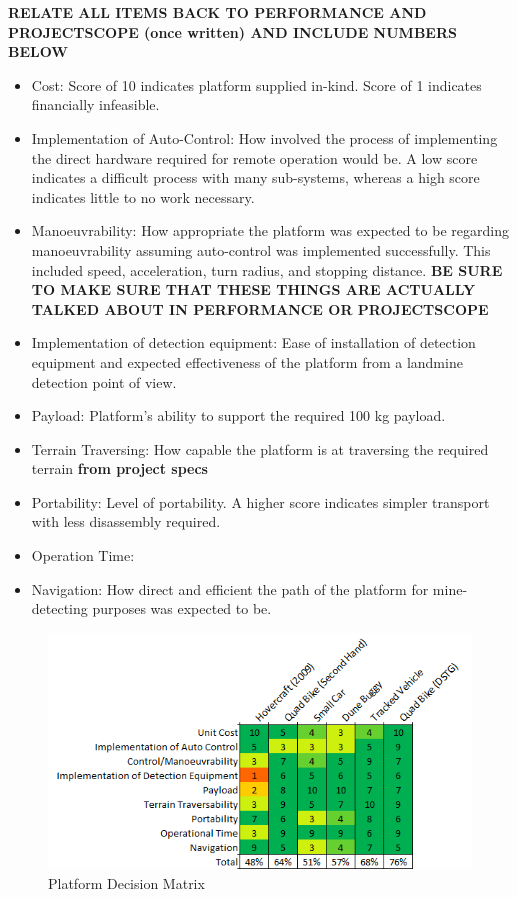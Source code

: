 \documentclass[main.tex]{subfiles}
\begin{document}
\textbf{\color{red} RELATE ALL ITEMS BACK TO PERFORMANCE AND PROJECTSCOPE (once written) AND INCLUDE NUMBERS BELOW}
\begin{itemize}
\item Cost: Score of 10 indicates platform supplied in-kind. Score of 1 indicates financially infeasible.
\item Implementation of Auto-Control: How involved the process of implementing the direct hardware required for remote operation would be. A low score indicates a difficult process with many sub-systems, whereas a high score indicates little to no work necessary.
\item Manoeuvrability: How appropriate the platform was expected to be regarding manoeuvrability assuming auto-control was implemented successfully. This included speed, acceleration, turn radius, and stopping distance. \textbf{\color{red} BE SURE TO MAKE SURE THAT THESE THINGS ARE ACTUALLY TALKED ABOUT IN PERFORMANCE OR PROJECTSCOPE}
\item Implementation of detection equipment: Ease of installation of detection equipment and expected effectiveness of the platform from a landmine detection point of view.
\item Payload: Platform's ability to support the required 100 kg payload.
\item Terrain Traversing: How capable the platform is at traversing the required terrain \textbf{\color{red} from project specs}
\item Portability: Level of portability. A higher score indicates simpler transport with less disassembly required.
\item Operation Time: 
\item Navigation: How direct and efficient the path of the platform for mine-detecting purposes was expected to be.
\end{itemize}

\begin{figure}[ht]
\includegraphics{4-ConceptDesign/platformDecision.png}
\centering
\caption{Platform Decision Matrix} 
\end{figure}
\end{document}
